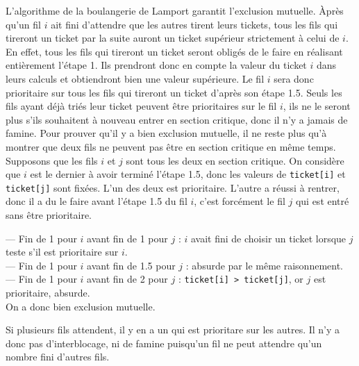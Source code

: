 \documentclass[french, 11pt]{article}
\begin{document}
\begin{prop}{}{}
    L'algorithme de la boulangerie de Lamport garantit l'exclusion mutuelle.
    \tcblower
    Àprès qu'un fil $i$ ait fini d'attendre que les autres tirent leurs tickets, tous les fils qui tireront un ticket par la suite auront un ticket supérieur strictement à celui de $i$.\n
    En effet, tous les fils qui tireront un ticket seront obligés de le faire en réalisant entièrement l'étape 1. Ils prendront donc en compte la valeur du ticket $i$ dans leurs calculs et obtiendront bien une valeur supérieure. Le fil $i$ sera donc prioritaire sur tous les fils qui tireront un ticket d'après son étape 1.5. Seuls les fils ayant déjà triés leur ticket peuvent être prioritaires sur le fil $i$, ils ne le seront plus s'ils souhaitent à nouveau entrer en section critique, donc il n'y a jamais de famine.\n
    Pour prouver qu'il y a bien exclusion mutuelle, il ne reste plus qu'à montrer que deux fils ne peuvent pas être en section critique en même temps. Supposons que les fils $i$ et $j$ sont tous les deux en section critique. On considère que $i$ est le dernier à avoir terminé l'étape 1.5, donc les valeurs de \texttt{ticket[i]} et \texttt{ticket[j]} sont fixées. L'un des deux est prioritaire. L'autre a réussi à rentrer, donc il a du le faire avant l'étape 1.5 du fil $i$, c'est forcément le fil $j$ qui est entré sans être prioritaire.
    \vspace*{0.2cm}
    \begin{center}\end{center}
    --- Fin de 1 pour $i$ avant fin de 1 pour $j$ : $i$ avait fini de choisir un ticket lorsque $j$ teste s'il est prioritaire sur $i$.\\
    --- Fin de 1 pour $i$ avant fin de 1.5 pour $j$ : absurde par le même raisonnement.\\
    --- Fin de 1 pour $i$ avant fin de 2 pour $j$ : \texttt{ticket[i] > ticket[j]}, or $j$ est prioritaire, absurde. \\
    On a donc bien exclusion mutuelle.

    Si plusieurs fils attendent, il y en a un qui est prioritare sur les autres. Il n'y a donc pas d'interblocage, ni de famine puisqu'un fil ne peut attendre qu'un nombre fini d'autres fils.
\end{prop}
\end{document}
